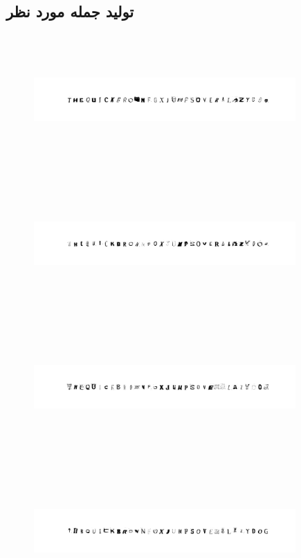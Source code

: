 \documentclass{article}
\begin{document}
\subsection{تولید جمله مورد نظر}
\begin{figure}[H]
	\centerline{\includegraphics[width=10cm , height=5cm ]{../results/CGAN_Adam/figs/sentences/THE QUICK BROWN FOX JUMPS OVER A LAZY DOG/60.pdf}}
\end{figure}

\begin{figure}[H]
	\centerline{\includegraphics[width=10cm , height=5cm ]{../results/CGAN_Adam/figs/sentences/THE QUICK BROWN FOX JUMPS OVER A LAZY DOG/70.pdf}}
\end{figure}

\begin{figure}[H]
	\centerline{\includegraphics[width=10cm , height=5cm ]{../results/CGAN_Adam/figs/sentences/THE QUICK BROWN FOX JUMPS OVER A LAZY DOG/80.pdf}}
\end{figure}

\begin{figure}[H]
	\centerline{\includegraphics[width=10cm , height=5cm ]{../results/CGAN_Adam/figs/sentences/THE QUICK BROWN FOX JUMPS OVER A LAZY DOG/90.pdf}}
\end{figure}
\end{document}

